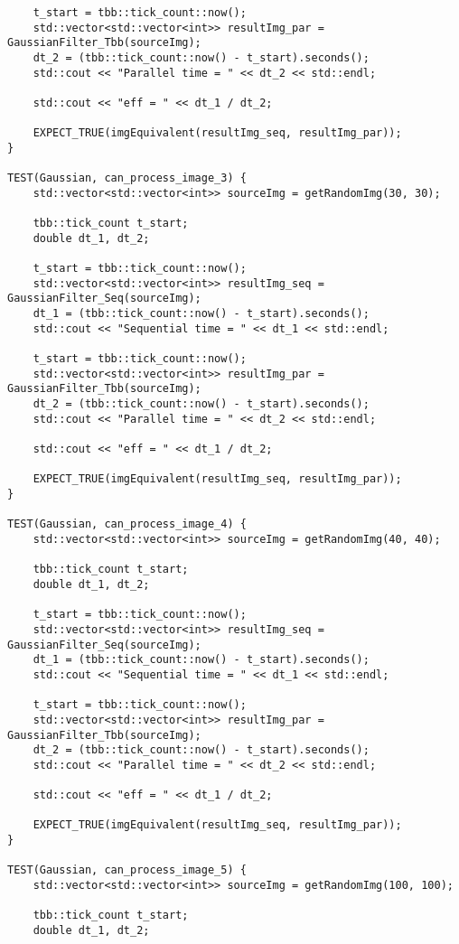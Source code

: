 \documentclass{report}
\begin{document}
\begin{lstlisting}
    t_start = tbb::tick_count::now();
    std::vector<std::vector<int>> resultImg_par = GaussianFilter_Tbb(sourceImg);
    dt_2 = (tbb::tick_count::now() - t_start).seconds();
    std::cout << "Parallel time = " << dt_2 << std::endl;

    std::cout << "eff = " << dt_1 / dt_2;

    EXPECT_TRUE(imgEquivalent(resultImg_seq, resultImg_par));
}

TEST(Gaussian, can_process_image_3) {
    std::vector<std::vector<int>> sourceImg = getRandomImg(30, 30);

    tbb::tick_count t_start;
    double dt_1, dt_2;

    t_start = tbb::tick_count::now();
    std::vector<std::vector<int>> resultImg_seq = GaussianFilter_Seq(sourceImg);
    dt_1 = (tbb::tick_count::now() - t_start).seconds();
    std::cout << "Sequential time = " << dt_1 << std::endl;

    t_start = tbb::tick_count::now();
    std::vector<std::vector<int>> resultImg_par = GaussianFilter_Tbb(sourceImg);
    dt_2 = (tbb::tick_count::now() - t_start).seconds();
    std::cout << "Parallel time = " << dt_2 << std::endl;

    std::cout << "eff = " << dt_1 / dt_2;

    EXPECT_TRUE(imgEquivalent(resultImg_seq, resultImg_par));
}

TEST(Gaussian, can_process_image_4) {
    std::vector<std::vector<int>> sourceImg = getRandomImg(40, 40);

    tbb::tick_count t_start;
    double dt_1, dt_2;

    t_start = tbb::tick_count::now();
    std::vector<std::vector<int>> resultImg_seq = GaussianFilter_Seq(sourceImg);
    dt_1 = (tbb::tick_count::now() - t_start).seconds();
    std::cout << "Sequential time = " << dt_1 << std::endl;

    t_start = tbb::tick_count::now();
    std::vector<std::vector<int>> resultImg_par = GaussianFilter_Tbb(sourceImg);
    dt_2 = (tbb::tick_count::now() - t_start).seconds();
    std::cout << "Parallel time = " << dt_2 << std::endl;

    std::cout << "eff = " << dt_1 / dt_2;

    EXPECT_TRUE(imgEquivalent(resultImg_seq, resultImg_par));
}

TEST(Gaussian, can_process_image_5) {
    std::vector<std::vector<int>> sourceImg = getRandomImg(100, 100);

    tbb::tick_count t_start;
    double dt_1, dt_2;


\end{lstlisting}
\end{document}

